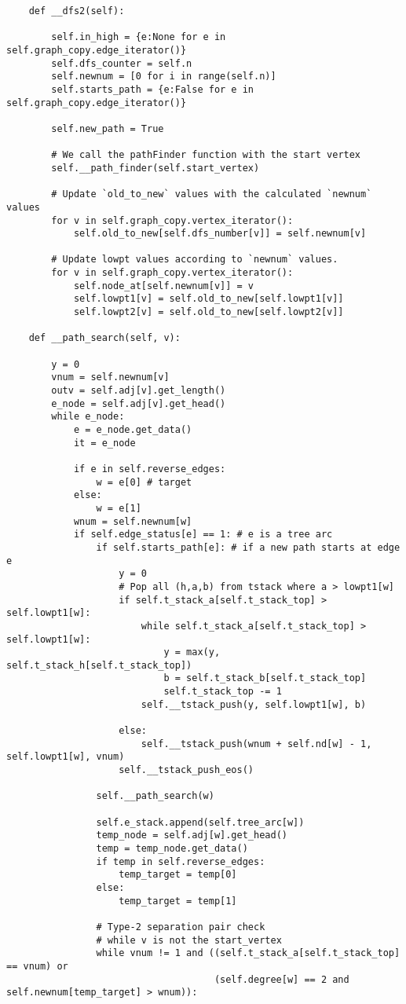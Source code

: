 \begin{verbatim}
	def __dfs2(self):

		self.in_high = {e:None for e in self.graph_copy.edge_iterator()}
		self.dfs_counter = self.n
		self.newnum = [0 for i in range(self.n)]
		self.starts_path = {e:False for e in self.graph_copy.edge_iterator()}

		self.new_path = True

		# We call the pathFinder function with the start vertex
		self.__path_finder(self.start_vertex)

		# Update `old_to_new` values with the calculated `newnum` values
		for v in self.graph_copy.vertex_iterator():
			self.old_to_new[self.dfs_number[v]] = self.newnum[v]

		# Update lowpt values according to `newnum` values.
		for v in self.graph_copy.vertex_iterator():
			self.node_at[self.newnum[v]] = v
			self.lowpt1[v] = self.old_to_new[self.lowpt1[v]]
			self.lowpt2[v] = self.old_to_new[self.lowpt2[v]]

	def __path_search(self, v):

		y = 0
		vnum = self.newnum[v]
		outv = self.adj[v].get_length()
		e_node = self.adj[v].get_head()
		while e_node:
			e = e_node.get_data()
			it = e_node

			if e in self.reverse_edges:
				w = e[0] # target
			else:
				w = e[1]
			wnum = self.newnum[w]
			if self.edge_status[e] == 1: # e is a tree arc
				if self.starts_path[e]: # if a new path starts at edge e
					y = 0
					# Pop all (h,a,b) from tstack where a > lowpt1[w]
					if self.t_stack_a[self.t_stack_top] > self.lowpt1[w]:
						while self.t_stack_a[self.t_stack_top] > self.lowpt1[w]:
							y = max(y, self.t_stack_h[self.t_stack_top])
							b = self.t_stack_b[self.t_stack_top]
							self.t_stack_top -= 1
						self.__tstack_push(y, self.lowpt1[w], b)

					else:
						self.__tstack_push(wnum + self.nd[w] - 1, self.lowpt1[w], vnum)
					self.__tstack_push_eos()

				self.__path_search(w)

				self.e_stack.append(self.tree_arc[w])
				temp_node = self.adj[w].get_head()
				temp = temp_node.get_data()
				if temp in self.reverse_edges:
					temp_target = temp[0]
				else:
					temp_target = temp[1]

				# Type-2 separation pair check
				# while v is not the start_vertex
				while vnum != 1 and ((self.t_stack_a[self.t_stack_top] == vnum) or
									 (self.degree[w] == 2 and self.newnum[temp_target] > wnum)):


\end{verbatim}
